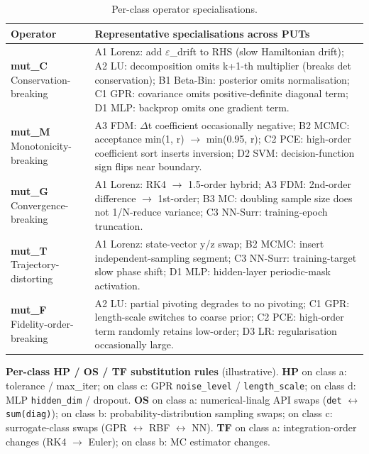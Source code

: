 \documentclass[review,12pt,authoryear]{elsarticle}
\begin{document}
{\def\LTcaptype{table} %
\begin{longtable}[]{@{}
  >{\raggedright\arraybackslash}p{}
  >{\raggedright\arraybackslash}p{}@{}}
\caption{Per-class operator specialisations.}\label{tab:p2-17}\\
\toprule\noalign{}
\begin{minipage}[b]{\linewidth}\raggedright
Operator
\end{minipage} & \begin{minipage}[b]{\linewidth}\raggedright
Representative specialisations across PUTs
\end{minipage} \\
\midrule\noalign{}
\endhead
\bottomrule\noalign{}
\endlastfoot
\textbf{mut\_C} Conservation-breaking & A1 Lorenz: add $\varepsilon$\_drift to RHS
(slow Hamiltonian drift); A2 LU: decomposition omits k+1-th multiplier
(breaks det conservation); B1 Beta-Bin: posterior omits normalisation;
C1 GPR: covariance omits positive-definite diagonal term; D1 MLP:
backprop omits one gradient term. \\
\textbf{mut\_M} Monotonicity-breaking & A3 FDM: $\Delta$t coefficient
occasionally negative; B2 MCMC: acceptance min(1, r) $\to$ min(0.95, r); C2
PCE: high-order coefficient sort inserts inversion; D2 SVM:
decision-function sign flips near boundary. \\
\textbf{mut\_G} Convergence-breaking & A1 Lorenz: RK4 $\to$ 1.5-order
hybrid; A3 FDM: 2nd-order difference $\to$ 1st-order; B3 MC: doubling sample
size does not 1/N-reduce variance; C3 NN-Surr: training-epoch
truncation. \\
\textbf{mut\_T} Trajectory-distorting & A1 Lorenz: state-vector y/z
swap; B2 MCMC: insert independent-sampling segment; C3 NN-Surr:
training-target slow phase shift; D1 MLP: hidden-layer periodic-mask
activation. \\
\textbf{mut\_F} Fidelity-order-breaking & A2 LU: partial pivoting
degrades to no pivoting; C1 GPR: length-scale switches to coarse prior;
C2 PCE: high-order term randomly retains low-order; D3 LR:
regularisation occasionally large. \\
\end{longtable}
}

\textbf{Per-class HP / OS / TF substitution rules} (illustrative).
\textbf{HP} on class a: tolerance / max\_iter; on class c: GPR
\texttt{noise\_level} / \texttt{length\_scale}; on class d: MLP
\texttt{hidden\_dim} / dropout. \textbf{OS} on class a: numerical-linalg
API swaps (\texttt{det} $\leftrightarrow$ \texttt{sum(diag)}); on class b:
probability-distribution sampling swaps; on class c: surrogate-class
swaps (GPR $\leftrightarrow$ RBF $\leftrightarrow$ NN). \textbf{TF} on class a: integration-order
changes (RK4 $\to$ Euler); on class b: MC estimator changes.
\end{document}
